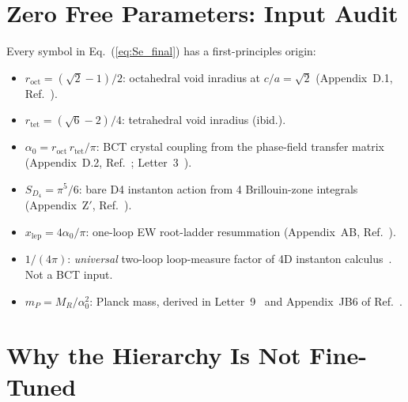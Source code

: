 \documentclass[twocolumn,10pt,a4paper]{article}
\begin{document}
\section*{Zero Free Parameters: Input Audit}

Every symbol in Eq.~(\ref{eq:Se_final}) has a first-principles origin:

\begin{itemize}
  \item $r_\mathrm{oct} = (\sqrt{2}-1)/2$: octahedral void inradius at
    $c/a=\sqrt{2}$ (Appendix~D.1, Ref.~\cite{monograph}).
  \item $r_\mathrm{tet} = (\sqrt{6}-2)/4$: tetrahedral void inradius
    (ibid.).
  \item $\alpha_0 = r_\mathrm{oct}\,r_\mathrm{tet}/\pi$: BCT crystal
    coupling from the phase-field transfer matrix (Appendix~D.2,
    Ref.~\cite{monograph}; Letter~3~\cite{finestructure}).
  \item $S_{D_4} = \pi^5/6$: bare D4 instanton action from 4 Brillouin-zone
    integrals (Appendix~Z$'$, Ref.~\cite{monograph}).
  \item $x_\mathrm{lep} = 4\alpha_0/\pi$: one-loop EW root-ladder
    resummation (Appendix~AB, Ref.~\cite{monograph}).
  \item $1/(4\pi)$: \textit{universal} two-loop loop-measure factor of 4D
    instanton calculus~\cite{thooft76,zinnjustin}. Not a BCT input.
  \item $m_P = M_R/\alpha_0^2$: Planck mass, derived in Letter~9~\cite{planck}
    and Appendix~JB6 of Ref.~\cite{monograph}.
\end{itemize}

\section*{Why the Hierarchy Is Not Fine-Tuned}
\end{document}
